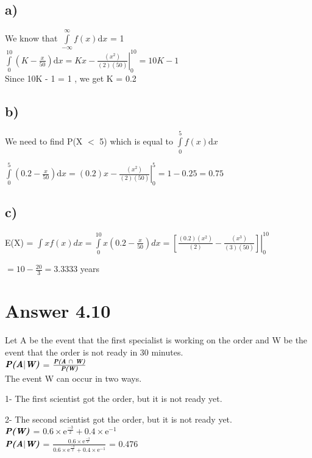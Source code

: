 \documentclass[12pt]{article}
\begin{document}
\subsection*{a)}
We know that $\int\limits_{-\infty}^\infty f(x) \mathrm{d}x$ = 1 \\

$\displaystyle{\int\limits_{0}^{10} (K - \frac{x}{50}) \mathrm{d}x  = Kx -\left.\frac{(x^2)}{(2)(50)} \right | _0^{10} = 10K - 1}$\\
Since 10K - 1 = 1 , we get K = 0.2 \\

\subsection*{b)}
We need to find P(X $<$ 5) which is equal to $\int\limits_0^5 f(x) \mathrm{d}x$ 

$\displaystyle{\int\limits_{0}^{5} (0.2 - \frac{x}{50}) \mathrm{d}x  = (0.2)x -\left.\frac{(x^2)}{(2)(50)} \right | _0^{5} = 1 - 0.25 = 0.75}$\\

\subsection*{c)}
E(X) = $\displaystyle{\int xf(x)dx = \int\limits_{0}^{10} x(0.2 - \frac{x}{50})dx = \left[ \frac{(0.2)(x^2)}{(2)} - \left.\frac{(x^3)}{(3)(50)}\right]  \right | _0^{10}} $

$\displaystyle{=10 - \frac{20}{3} = 3.3333}$ years

\section*{Answer 4.10}

Let A be the event that the first specialist is working on the order and W be the event that the order is not ready in 30 minutes. \\

$\textbf{\textit{P(A$\vert$W)}}$ = $\frac{\textbf{\textit{P(A $\cap$ W)}}}{\textbf{\textit{P(W)}}} $ \\

The event W can occur in two ways.

1- The first scientist got the order, but it is not ready yet. 

2- The second scientist got the order, but it is not ready yet. \\

$\textbf{\textit{P(W)}}$ = $ 0.6 \times \mathrm{e}^{\frac{-3}{2}} + 0.4 \times \mathrm{e}^{-1} $ \\

$\textbf{\textit{P(A$\vert$W)}}$ = $\frac{0.6 \times \mathrm{e}^\frac{-3}{2}}{ 0.6 \times \mathrm{e}^{\frac{-3}{2}} + 0.4 \times \mathrm{e}^{-1}} $ = 0.476
\end{document}

